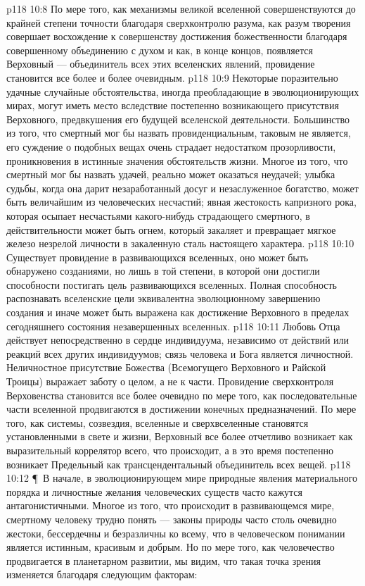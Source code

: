 \vs p118 10:8 По мере того, как механизмы великой вселенной совершенствуются до крайней степени точности благодаря сверхконтролю разума, как разум творения совершает восхождение к совершенству достижения божественности благодаря совершенному объединению с духом и как, в конце концов, появляется Верховный ---  объединитель всех этих вселенских явлений, провидение становится все более и более очевидным.
\vs p118 10:9 Некоторые поразительно удачные случайные обстоятельства, иногда преобладающие в эволюционирующих мирах, могут иметь место вследствие постепенно возникающего присутствия Верховного, предвкушения его будущей вселенской деятельности. Большинство из того, что смертный мог бы назвать провиденциальным, таковым не является, его суждение о подобных вещах очень страдает недостатком прозорливости, проникновения в истинные значения обстоятельств жизни. Многое из того, что смертный мог бы назвать удачей, реально может оказаться неудачей; улыбка судьбы, когда она дарит незаработанный досуг и незаслуженное богатство, может быть величайшим из человеческих несчастий; явная жестокость капризного рока, которая осыпает несчастьями какого\hyp{}нибудь страдающего смертного, в действительности может быть огнем, который закаляет и превращает мягкое железо незрелой личности в закаленную сталь настоящего характера.
\vs p118 10:10 Существует провидение в развивающихся вселенных, оно может быть обнаружено созданиями, но лишь в той степени, в которой они достигли способности постигать цель развивающихся вселенных. Полная способность распознавать вселенские цели эквивалентна эволюционному завершению создания и иначе может быть выражена как достижение Верховного в пределах сегодняшнего состояния незавершенных вселенных.
\vs p118 10:11 Любовь Отца действует непосредственно в сердце индивидуума, независимо от действий или реакций всех других индивидуумов; связь человека и Бога является личностной. Неличностное присутствие Божества (Всемогущего Верховного и Райской Троицы) выражает заботу о целом, а не к части. Провидение сверхконтроля Верховенства становится все более очевидно по мере того, как последовательные части вселенной продвигаются в достижении конечных предназначений. По мере того, как системы, созвездия, вселенные и сверхвселенные становятся установленными в свете и жизни, Верховный все более отчетливо возникает как выразительный коррелятор всего, что происходит, а в это время постепенно возникает Предельный как трансцендентальный объединитель всех вещей.
\vs p118 10:12 \P\ В начале, в эволюционирующем мире природные явления материального порядка и личностные желания человеческих существ часто кажутся антагонистичными. Многое из того, что происходит в развивающемся мире, смертному человеку трудно понять --- законы природы часто столь очевидно жестоки, бессердечны и безразличны ко всему, что в человеческом понимании является истинным, красивым и добрым. Но по мере того, как человечество продвигается в планетарном развитии, мы видим, что такая точка зрения изменяется благодаря следующим факторам:
